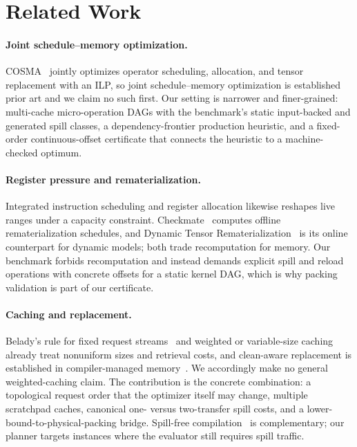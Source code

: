 \section{Related Work}\label{sec:related}

\paragraph{Joint schedule--memory optimization.}
COSMA~\citep{li2023combined} jointly optimizes operator scheduling, allocation,
and tensor replacement with an ILP, so joint schedule--memory optimization is
established prior art and we claim no such first.  Our setting is narrower and
finer-grained: multi-cache micro-operation DAGs with the benchmark's static
input-backed and generated spill classes, a dependency-frontier production
heuristic, and a fixed-order continuous-offset certificate that connects the
heuristic to a machine-checked optimum.

\paragraph{Register pressure and rematerialization.}
Integrated instruction scheduling and register allocation
\citep{goodman1988integrated,shobaki2013preallocation,shobaki2022register}
likewise reshapes live ranges under a capacity constraint.
Checkmate~\citep{jain2019checkmate} computes offline rematerialization
schedules, and Dynamic Tensor Rematerialization~\citep{kirisame2020dtr} is its
online counterpart for dynamic models; both trade recomputation for memory.
Our benchmark forbids recomputation and instead demands explicit spill and
reload operations with concrete offsets for a static kernel DAG, which is why
packing validation is part of our certificate.

\paragraph{Caching and replacement.}
Belady's rule for fixed request streams~\citep{belady1966study} and weighted or
variable-size caching~\citep{coester2022blockaware} already treat nonuniform
sizes and retrieval costs, and clean-aware replacement is established in
compiler-managed memory~\citep{liberatore1999evaluation,guo2004belady}.  We
accordingly make no general weighted-caching claim.  The contribution is the
concrete combination: a topological request order that the optimizer itself
may change, multiple scratchpad caches, canonical one- versus two-transfer
spill costs, and a lower-bound-to-physical-packing bridge.  Spill-free
compilation~\citep{chatarasi2026spillfree} is complementary; our planner
targets instances where the evaluator still requires spill traffic.
